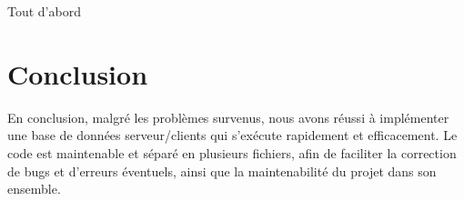 \documentclass[utf8]{article}
\begin{document}
Tout d'abord
\section{Conclusion}
En conclusion, malgré les problèmes survenus, nous avons réussi à implémenter une base de données serveur/clients qui s'exécute rapidement et efficacement.\newline
Le code est maintenable et séparé en plusieurs fichiers, afin de faciliter la correction de bugs et d'erreurs éventuels, ainsi que la maintenabilité du projet dans son ensemble.
\end{document}
